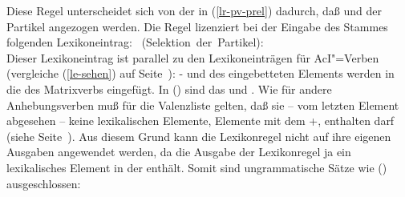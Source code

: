 \noindent
Diese Regel unterscheidet sich von der in (\ref{lr-pv-prel}) dadurch, daß \subj und \subcat
der Partikel angezogen werden. Die Regel lizenziert bei der Eingabe des Stammes  
folgenden Lexikoneintrag:
\newsavebox{\boxxcompargat}
%
\eas
\label{le-lach-+particle}
\mbox{ (Selektion der Partikel):}\\
\zs
Dieser Lexikoneintrag ist parallel zu den Lexikoneinträgen für AcI"=Verben (vergleiche (\ref{le-sehen})
auf Seite~\pageref{le-sehen}): \subj- und \subcatw des eingebetteten Elements werden in die
\subcatl des Matrixverbs eingefügt. In () sind das  und .
Wie für andere Anhebungsverben muß für die Valenzliste gelten, daß sie -- vom letzten Element abgesehen
-- keine lexikalischen Elemente, \dash Elemente mit dem \lexw +, enthalten darf (siehe Seite~\pageref{constr-non-complex-forming}).
Aus diesem Grund kann die Lexikonregel nicht auf ihre eigenen Ausgaben angewendet werden,
da die Ausgabe der Lexikonregel ja ein lexikalisches Element in der \subcatl enthält.
Somit sind ungrammatische Sätze wie () ausgeschlossen:
\z

